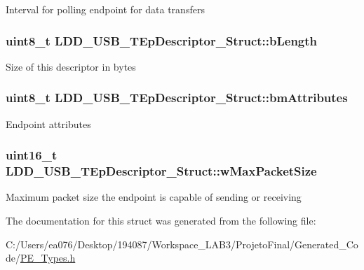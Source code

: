 Interval for polling endpoint for data transfers \hypertarget{struct_l_d_d___u_s_b___t_ep_descriptor___struct_ad4cc2b6088c7fb913f40eada94098393}{
\subsubsection[{b\-Length}]{\setlength{\rightskip}{0pt plus 5cm}uint8\-\_\-t L\-D\-D\-\_\-\-U\-S\-B\-\_\-\-T\-Ep\-Descriptor\-\_\-\-Struct\-::b\-Length}}\label{struct_l_d_d___u_s_b___t_ep_descriptor___struct_ad4cc2b6088c7fb913f40eada94098393}
Size of this descriptor in bytes \hypertarget{struct_l_d_d___u_s_b___t_ep_descriptor___struct_a7a3e6205355d7fa84899f23ac8e58490}{
\subsubsection[{bm\-Attributes}]{\setlength{\rightskip}{0pt plus 5cm}uint8\-\_\-t L\-D\-D\-\_\-\-U\-S\-B\-\_\-\-T\-Ep\-Descriptor\-\_\-\-Struct\-::bm\-Attributes}}\label{struct_l_d_d___u_s_b___t_ep_descriptor___struct_a7a3e6205355d7fa84899f23ac8e58490}
Endpoint attributes \hypertarget{struct_l_d_d___u_s_b___t_ep_descriptor___struct_a19e3e6b0524f2fcd25377f008c94c3c6}{
\subsubsection[{w\-Max\-Packet\-Size}]{\setlength{\rightskip}{0pt plus 5cm}uint16\-\_\-t L\-D\-D\-\_\-\-U\-S\-B\-\_\-\-T\-Ep\-Descriptor\-\_\-\-Struct\-::w\-Max\-Packet\-Size}}\label{struct_l_d_d___u_s_b___t_ep_descriptor___struct_a19e3e6b0524f2fcd25377f008c94c3c6}
Maximum packet size the endpoint is capable of sending or receiving 

The documentation for this struct was generated from the following file\-:\begin{DoxyCompactItemize}
\item 
C\-:/\-Users/ea076/\-Desktop/194087/\-Workspace\-\_\-\-L\-A\-B3/\-Projeto\-Final/\-Generated\-\_\-\-Code/\hyperlink{_p_e___types_8h}{P\-E\-\_\-\-Types.\-h}\end{DoxyCompactItemize}
